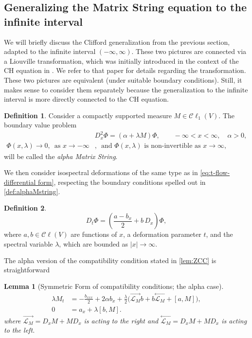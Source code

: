 \documentclass[10pt,a4paper]{article}
\numberwithin{equation}{section}
\theoremstyle{plain}
\newtheorem{lemma}[lemma]{Lemma}
\theoremstyle{definition}
\newtheorem{definition}[definition]{Definition}
\newcommand\Cl{\mathcal{C}\ell}
\newcommand{\abs}[1]{\left\lvert #1 \right\rvert}
\newcommand{\InMb}{\stackrel{\leftarrow}{\mathcal{L}_{M}}}
\newcommand{\InMf}{\stackrel{\rightarrow}{\mathcal{L}_{M}}}
\renewcommand{\l}{\lambda}
\begin{document}
\subsection{Generalizing the Matrix String equation to the infinite interval} 
We will briefly discuss the Clifford generalization from the previous section, adapted to the infinite interval $(-\infty, \infty)$.  These two pictures are connected via a Liouville transformation, which was initially introduced in 
the context of the CH equation in \cite{beals-sattinger-szmigielski:1998:acoustic-scattering-KdV-hierarchy}.  We refer to that paper for details regarding the transformation.  
These two pictures are equivalent (under suitable boundary conditions). Still, it makes sense to consider them separately because the generalization to the infinite interval is more directly connected to the CH equation.  \begin{definition} \label{def:alphaMstring}
Consider a compactly supported measure $M\in \Cl_1(V)$.  
The boundary value problem 
\begin{align*} 
&D_x^2 \Phi=(\alpha+\lambda M) \Phi, \qquad   -\infty<x<\infty, \quad \alpha >0,  \\
\Phi(x, \lambda) \rightarrow 0, \, \text{ as } x\rightarrow -\infty &,\, \text{ and $\Phi(x,\l)$ is non-invertible as } x\rightarrow \infty, 
\end{align*} 
will be called the \emph{alpha Matrix String}.  
  
\end{definition} 
We then consider isospectral deformations of the same type as in \eqref{eq:t-flow-differential form}, respecting the boundary conditions spelled out in 
\autoref{def:alphaMstring}.  
\begin{definition}\label{def:alphaMstring-Deformation}  
\begin{equation}\label{eq:alpha-t-flow-differential form} 
D_t \Phi=(\frac{a-b_x}{2} +b\, D_x)\Phi, 
\end{equation}
where $a,b\in \Cl(V) $ are functions of $x$, a deformation parameter $t$,  and the spectral variable $\lambda$, which are bounded as $\abs{x} \rightarrow \infty$.    
\end{definition} 
The alpha version of the compatibility condition stated in \autoref{lem:ZCC} is straightforward
\begin{lemma}[Symmetric Form of compatibility conditions; the alpha case]\label{lem:alphaZCC}
\begin{subequations}
\begin{align}
\lambda M_t&=-\frac{b_{xxx}}{2}+2\alpha b_x+\frac{\lambda}{2}\big(\InMf b+b\InMb+
[a,M]\big), \label{eq:alpha-t-flow}\\
0&=a_x+\lambda[b,M]. \label{eq:alpha-constraints} 
\end{align}
\end{subequations}
where $\InMf=D_x M+MD_x$ is acting to the right and $\InMb=D_x M+MD_x$ is acting to the left.  
\end{lemma} 
\end{document}
